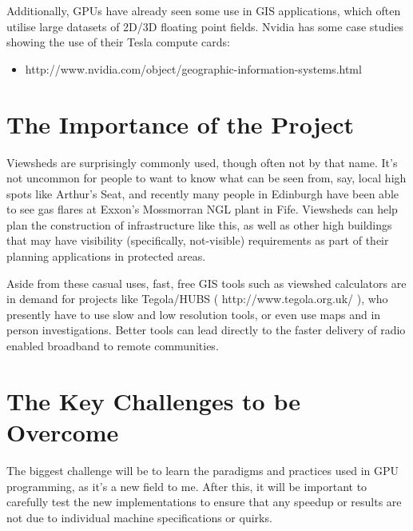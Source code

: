 \documentclass[a4paper]{article}
\begin{document}
        Additionally, GPUs have already seen some use in GIS applications, which often utilise large datasets of 2D/3D
        floating point fields. Nvidia has some case studies showing the use of their Tesla compute cards:
        \begin{itemize}
            \item http://www.nvidia.com/object/geographic-information-systems.html
        \end{itemize}
    \section{The Importance of the Project}
        Viewsheds are surprisingly commonly used, though often not by that name. It's not uncommon for people to want
        to know what can be seen from, say, local high spots like Arthur's Seat, and recently many people in Edinburgh
        have been able to see gas flares at Exxon's Mossmorran NGL plant in Fife. Viewsheds can help plan the
        construction of infrastructure like this, as well as other high buildings that may have visibility
        (specifically, not-visible) requirements as part of their planning applications in protected areas.

        Aside from these casual uses, fast, free GIS tools such as viewshed calculators are in demand for projects like
        Tegola/HUBS ( http://www.tegola.org.uk/ ), who presently have to use slow and low resolution tools, or even use
        maps and in person investigations. Better tools can lead directly to the faster delivery of radio enabled
        broadband to remote communities.
    \section{The Key Challenges to be Overcome}
        The biggest challenge will be to learn the paradigms and practices used in GPU programming, as it's a new field
        to me. After this, it will be important to carefully test the new implementations to ensure that any speedup or
        results are not due to individual machine specifications or quirks.
\end{document}
